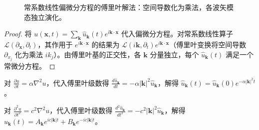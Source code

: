 \begin{figure}[htbp]
\centering
{}
\caption{常系数线性偏微分方程的傅里叶解法：空间导数化为乘法，各波矢模态独立演化。}
\label{fig:pde_fourier_flow}
\end{figure}

\begin{proof}
将 $u(\mathbf{x}, t) = \sum_{\mathbf{k}} \hat{u}_{\mathbf{k}}(t) e^{i \mathbf{k} \cdot \mathbf{x}}$ 代入偏微分方程。对常系数线性算子 $\mathcal{L}(\partial_{\mathbf{x}}, \partial_t)$，其作用于 $e^{i\mathbf{k}\cdot\mathbf{x}}$ 的结果为 $\mathcal{L}(i\mathbf{k}, \partial_t) e^{i\mathbf{k}\cdot\mathbf{x}}$（傅里叶变换将空间导数 $\partial_{x_j}$ 化为乘法 $ik_j$）。由傅里叶基的正交性，各 $\mathbf{k}$ 分量独立，每个 $\hat{u}_{\mathbf{k}}(t)$ 满足一个常微分方程。
\end{proof}

\begin{example}[热传导方程的傅里叶解法]\label{ex:heat_fourier}
对 $\frac{\partial u}{\partial t} = \alpha \nabla^2 u$，代入傅里叶级数得 $\frac{d \hat{u}_{\mathbf{k}}}{dt} = -\alpha |\mathbf{k}|^2 \hat{u}_{\mathbf{k}}$，解得 $\hat{u}_{\mathbf{k}}(t) = \hat{u}_{\mathbf{k}}(0) e^{-\alpha |\mathbf{k}|^2 t}$。
\end{example}

\begin{example}[波动方程的傅里叶解法]\label{ex:wave_fourier}
对 $\frac{\partial^2 u}{\partial t^2} = c^2 \nabla^2 u$，代入傅里叶级数得 $\frac{d^2 \hat{u}_{\mathbf{k}}}{dt^2} = -c^2 |\mathbf{k}|^2 \hat{u}_{\mathbf{k}}$，解得 $\hat{u}_{\mathbf{k}}(t) = A_{\mathbf{k}} e^{i c |\mathbf{k}| t} + B_{\mathbf{k}} e^{-i c |\mathbf{k}| t}$。
\end{example}


